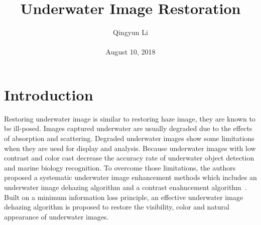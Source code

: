 \documentclass[10pt,twocolumn,letterpaper]{article}
\begin{document}
\author{Qingyun Li\\\\
August 10, 2018}        
\title{Underwater Image Restoration}

\maketitle

\section{Introduction}
\par Restoring underwater image is similar to restoring haze image, they are known to be ill-posed. Images captured underwater are usually degraded due to the effects of absorption and scattering. Degraded underwater images show some limitations when they are uesd for display and analysis. Because underwater images with low contrast and color cast decrease the accuracy rate of underwater object detection and marine biology recognition. To overcome those limitations, the authors proposed a systematic underwater image enhancement methods which includes an underwater image dehazing algorithm and a contrast enahncement algorithm~\cite{Li2016Underwater}. Built on a minimum information loss principle, an effective underwater image dehazing algorithm is proposed to restore the visibility, color and natural appearance of underwater images. 
\end{document}
